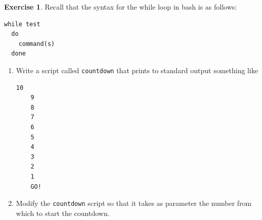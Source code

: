 \documentclass[a4paper,11pt]{article}
\theoremstyle{plain}
\theoremstyle{definition}
\newtheorem{exercice}{Exercise}
\begin{document}

\begin{exercice}
Recall that the syntax for the while loop in bash is as follows:
\begin{lstlisting}[numbers=none]
  while test
  do
    command(s)
  done
\end{lstlisting}
\begin{enumerate}
\item
Write a script called \texttt{countdown} that prints to standard output something like
\begin{lstlisting}[numbers=none,language={}]
    10
    9
    8
    7
    6
    5
    4
    3
    2
    1
    GO!
\end{lstlisting}
\item Modify the \texttt{countdown} script so that it takes as parameter the number from which to start the countdown.
\end{enumerate}
\end{exercice}
\end{document}
